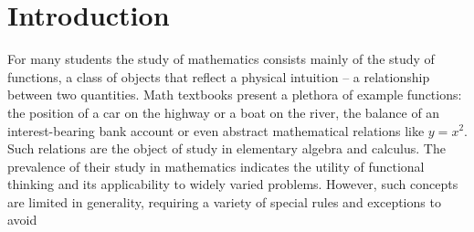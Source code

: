 \chapter*{Introduction}

  For many students the study of mathematics consists mainly of the study of functions, a class of objects that reflect a physical intuition -- a relationship between two quantities.
  Math textbooks present a plethora of example functions: the position of a car on the highway or a boat on the river, the balance of an interest-bearing bank account or even abstract mathematical relations like $y=x^2$.
  Such relations are the object of study in elementary algebra and calculus. 
  The prevalence of their study in mathematics indicates the utility of functional thinking and its applicability to widely varied problems.
  However, such concepts are limited in generality, requiring a variety of special rules and exceptions to avoid 
